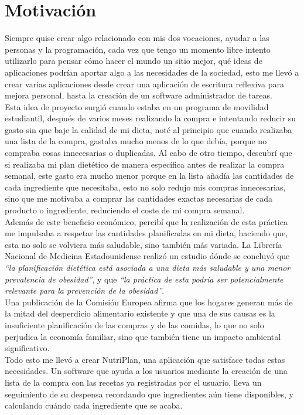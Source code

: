 \documentclass[twoside, openright, 11pt]{report}
\begin{document}
  \section{Motivación} 
  Siempre quise crear algo relacionado con mis dos vocaciones, ayudar a las personas y la programación, cada vez que tengo un momento libre intento utilizarlo para pensar cómo hacer el mundo un sitio mejor, qué ideas de aplicaciones podrían aportar algo a las necesidades de la sociedad, esto me llevó a crear varias aplicaciones desde crear una aplicación de escritura reflexiva para mejora personal, hasta la creación de un software administrador de tareas.
  \\
  Esta idea de proyecto surgió cuando estaba en un programa de movilidad estudiantil, después de varios meses realizando la compra e intentando reducir su gasto sin que baje la calidad de mi dieta, noté al principio que cuando realizaba una lista de la compra, gastaba mucho menos de lo que debía, porque no compraba cosas innecesarias o duplicadas. Al cabo de otro tiempo, descubrí que si realizaba mi plan dietético de manera específica antes de realizar la compra semanal, este gasto era mucho menor porque en la lista añadía las cantidades de cada ingrediente que necesitaba, esto no solo redujo mis compras innecesarias, sino que me motivaba a comprar las cantidades exactas necesarias de cada producto o ingrediente, reduciendo el coste de mi compra semanal. 
  \\
  Además de este beneficio económico, percibí que la realización de esta práctica me impulsaba a respetar las cantidades planificadas en mi dieta, haciendo que, esta no solo se volviera más saludable, sino también más variada.
  La Librería Nacional de Medicina Estadounidense realizó un estudio dónde se concluyó que \textit{“la planificación dietética está asociada a una dieta más saludable y una menor prevalencia de obesidad”}\cite{NLMMealPlanningBenefits}, y que \textit{“la práctica de esta podría ser potencialmente relevante para la prevención de la obesidad”}\cite{NLMMealPlanningBenefits}. 
  \\
  Una publicación de la Comisión Europea afirma que los hogares generan más de la mitad del desperdicio alimentario existente y que una de sus causas es la insuficiente planificación de las compras y de las comidas, lo que no solo perjudica la economía familiar, sino que también tiene un impacto ambiental significativo.
  \\
  Todo esto me llevó a crear NutriPlan, una aplicación que satisface todas estas necesidades. Un software que ayuda a los usuarios mediante la creación de una lista de la compra con las recetas ya registradas por el usuario, lleva un seguimiento de su despensa recordando que ingredientes aún tiene disponibles, y calculando cuándo cada ingrediente que se acaba.
  
\end{document}
